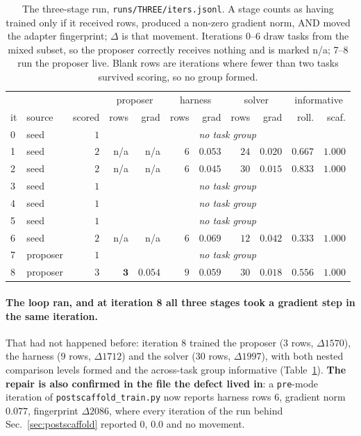 \begin{table}[t]
\centering\small
\caption{The three-stage run, \texttt{runs/THREE/iters.jsonl}. A stage counts as having trained
only if it received rows, produced a non-zero gradient norm, AND moved the adapter
fingerprint; $\Delta$ is that movement. Iterations 0--6 draw tasks from the mixed subset, so
the proposer correctly receives nothing and is marked n/a; 7--8 run the proposer live.
Blank rows are iterations where fewer than two tasks survived scoring, so no group formed.}
\label{tab:threestage}
\begin{tabular}{llrrrrrrrrr}
\toprule
& & & \multicolumn{2}{c}{proposer} & \multicolumn{2}{c}{harness} & \multicolumn{2}{c}{solver}
& \multicolumn{2}{c}{informative} \\
\cmidrule(lr){4-5}\cmidrule(lr){6-7}\cmidrule(lr){8-9}\cmidrule(lr){10-11}
it & source & scored & rows & grad & rows & grad & rows & grad & roll. & scaf. \\
\midrule
0 & seed     & $1$ & \multicolumn{8}{c}{\emph{no task group}} \\
1 & seed     & $2$ & n/a & n/a & $6$ & $0.053$ & $24$ & $0.020$ & $0.667$ & $1.000$ \\
2 & seed     & $2$ & n/a & n/a & $6$ & $0.045$ & $30$ & $0.015$ & $0.833$ & $1.000$ \\
3 & seed     & $1$ & \multicolumn{8}{c}{\emph{no task group}} \\
4 & seed     & $1$ & \multicolumn{8}{c}{\emph{no task group}} \\
5 & seed     & $1$ & \multicolumn{8}{c}{\emph{no task group}} \\
6 & seed     & $2$ & n/a & n/a & $6$ & $0.069$ & $12$ & $0.042$ & $0.333$ & $1.000$ \\
7 & proposer & $1$ & \multicolumn{8}{c}{\emph{no task group}} \\
8 & proposer & $3$ & $\mathbf{3}$ & $\mathbf{0.054}$ & $9$ & $0.059$ & $30$ & $0.018$ &
$0.556$ & $1.000$ \\
\bottomrule
\end{tabular}
\end{table}

\paragraph{The loop ran, and at iteration 8 all three stages took a gradient step in the same
iteration.} That had not happened before: iteration 8 trained the proposer ($3$ rows,
$\Delta 1570$), the harness ($9$ rows, $\Delta 1712$) and the solver ($30$ rows, $\Delta 1997$),
with both nested comparison levels formed and the across-task group informative
(Table~\ref{tab:threestage}). \textbf{The repair is also confirmed in the file the defect lived
in}: a \texttt{pre}-mode iteration of \texttt{postscaffold\_train.py} now reports harness rows
$6$, gradient norm $0.077$, fingerprint $\Delta 2086$, where every iteration of the run behind
Sec.~\ref{sec:postscaffold} reported $0$, $0.0$ and no movement.

